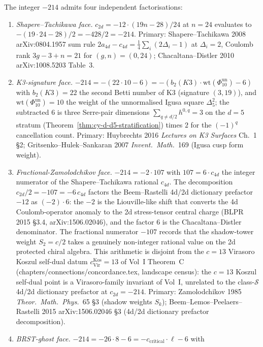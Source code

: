\begin{remark}[\texorpdfstring{$c_{2d}=-214$}{c-2d=-214} and its four factorisations]
The integer $-214$ admits four independent factorisations:
\begin{enumerate}
\item \emph{Shapere--Tachikawa face.} $c_{2d} = -12\cdot (19n-28)/24$
 at $n=24$ evaluates to $-(19\cdot 24-28)/2 = -428/2 = -214$.
 Primary: Shapere--Tachikawa 2008 arXiv:0804.1957 sum rule
 $2a_{4d}-c_{4d} = \tfrac{1}{4}\sum_i(2\Delta_i-1)$ at
 $\Delta_i=2$, Coulomb rank \(3g-3+n=21\) for \((g,n)=(0,24)\);
 Chacaltana--Distler 2010 arXiv:1008.5203 Table~3.
\item \emph{K3-signature face.} $-214 = -(22\cdot 10 - 6)
 = -(b_2(K3)\cdot\mathrm{wt}(\Phi_{10}^{\mathrm{un}}) - 6)$ with $b_2(K3) = 22$
 the second Betti number of K3 (signature $(3,19)$), and
 $\mathrm{wt}(\Phi_{10}^{\mathrm{un}}) = 10$ the weight of the
 unnormalised Igusa square $\Delta_5^2$;
 the subtracted $6$ is three Serre-pair dimensions
 $\sum_{q\neq d/2} h^{0,q} = 3$ on the $d=5$ stratum
 (Theorem~\ref{thm:cy-d-d5-stratification}) times $2$ for the
 $(-1)^q$ cancellation count. Primary: Huybrechts 2016
 \emph{Lectures on K3 Surfaces} Ch.~1 \S2; Gritsenko--Hulek--Sankaran
 2007 \emph{Invent.~Math.}~169 (Igusa cusp form weight).
\item \emph{Fractional-Zamolodchikov face.} $-214 = -2\cdot 107$
 with $107 = 6\cdot c_{4d}$ the integer numerator of the Shapere--Tachikawa
 rational $c_{4d}$. The decomposition
 $c_{2d}/2 = -107 = -6\,c_{4d}$ factors the Beem--Rastelli 4d/2d
 dictionary prefactor $-12$ as $(-2)\cdot 6$: the $-2$ is the
 Liouville-like shift that converts the 4d Coulomb-operator
 anomaly to the 2d stress-tensor central charge (BLPR 2015 \S3.4,
 arXiv:1506.02046), and the factor $6$ is the Chacaltana--Distler
 denominator. The fractional numerator $-107$ records that the
 shadow-tower weight $S_2 = c/2$ takes a genuinely non-integer
 rational value on the 2d protected chiral algebra. This
 arithmetic is disjoint from the $c = 13$ Virasoro Koszul self-dual datum $c_{\mathrm{Vir}}^{\mathrm{Kos}} = 13$ of Vol~I
 Theorem~C (chapters/connections/concordance.tex, landscape
 census): the $c = 13$ Koszul self-dual point is a Virasoro-family
 invariant of Vol~I, unrelated to the class-$\mathcal S$ 4d/2d dictionary
 prefactor at $c_{2d} = -214$. Primary: Zamolodchikov 1985
 \emph{Theor.~Math.~Phys.}~65 \S3 (shadow weights $S_k$);
 Beem--Lemos--Peelaers--Rastelli 2015 arXiv:1506.02046 \S3
 (4d/2d dictionary prefactor decomposition).
\item \emph{BRST-ghost face.} $-214 = -26\cdot 8 - 6
 = -c_{\mathrm{critical}}\cdot\ell - 6$ with

\end{enumerate}
\end{remark}
